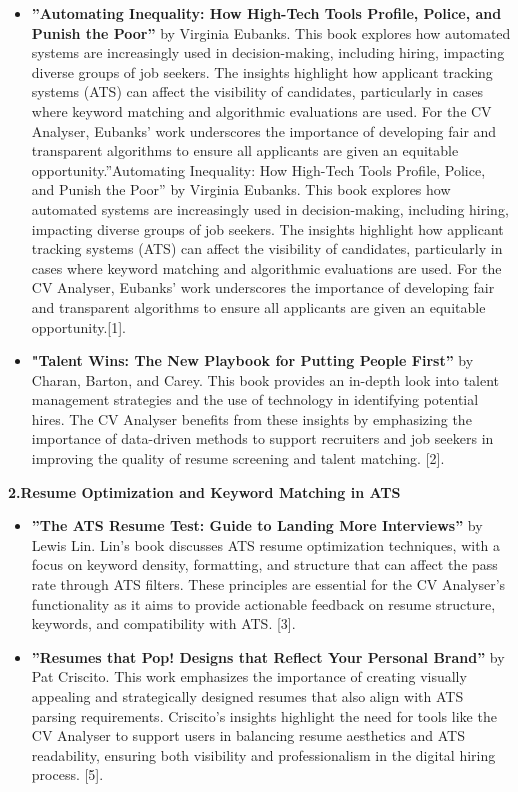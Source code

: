 \documentclass[12pt,a4paper]{report}
\begin{document}
\begin{itemize} \item \textbf{”Automating Inequality: How High-Tech Tools Profile, Police, and Punish the Poor”} by Virginia Eubanks. This book explores how automated systems are increasingly used in decision-making, including hiring, impacting diverse groups of job seekers. The insights highlight how applicant tracking systems (ATS) can affect the visibility of candidates, particularly in cases where keyword matching and algorithmic evaluations are used. For the CV Analyser, Eubanks' work underscores the importance of developing fair and transparent algorithms to ensure all applicants are given an equitable opportunity.”Automating Inequality: How High-Tech Tools Profile, Police, and Punish the Poor” by Virginia Eubanks. This book explores how automated systems are increasingly used in decision-making, including hiring, impacting diverse groups of job seekers. The insights highlight how applicant tracking systems (ATS) can affect the visibility of candidates, particularly in cases where keyword matching and algorithmic evaluations are used. For the CV Analyser, Eubanks' work underscores the importance of developing fair and transparent algorithms to ensure all applicants are given an equitable opportunity.[1].

\item \textbf{"Talent Wins: The New Playbook for Putting People First”} by Charan, Barton, and Carey. This book provides an in-depth look into talent management strategies and the use of technology in identifying potential hires. The CV Analyser benefits from these insights by emphasizing the importance of data-driven methods to support recruiters and job seekers in improving the quality of resume screening and talent matching. [2]. \end{itemize}

\textbf{2.Resume Optimization and Keyword Matching in ATS}

\begin{itemize} \item \textbf{”The ATS Resume Test: Guide to Landing More Interviews”} by Lewis Lin. Lin’s book discusses ATS resume optimization techniques, with a focus on keyword density, formatting, and structure that can affect the pass rate through ATS filters. These principles are essential for the CV Analyser’s functionality as it aims to provide actionable feedback on resume structure, keywords, and compatibility with ATS. [3].


\item \textbf{”Resumes that Pop! Designs that Reflect Your Personal Brand”} by Pat Criscito. This work emphasizes the importance of creating visually appealing and strategically designed resumes that also align with ATS parsing requirements. Criscito's insights highlight the need for tools like the CV Analyser to support users in balancing resume aesthetics and ATS readability, ensuring both visibility and professionalism in the digital hiring process. [5]. \end{itemize}
\end{document}
